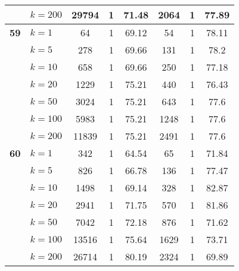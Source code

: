 \begin{table}[htbp]
\begin{tabular}{|l|l|c|c|c|c|c|c|}
     & $k=200$ & 29794 & 1 & 71.48 & 2064 & 1 & 77.89 \\ \hline
    \multicolumn{1}{|r|}{\textbf{59}} & $k=1$ & 64 & 1 & 69.12 & 54 & 1 & 78.11 \\ 
     & $k=5$ & 278 & 1 & 69.66 & 131 & 1 & 78.2 \\ 
     & $k=10$ & 658 & 1 & 69.66 & 250 & 1 & 77.18 \\ 
     & $k=20$ & 1229 & 1 & 75.21 & 440 & 1 & 76.43 \\ 
     & $k=50$ & 3024 & 1 & 75.21 & 643 & 1 & 77.6 \\ 
     & $k=100$ & 5983 & 1 & 75.21 & 1248 & 1 & 77.6 \\ 
     & $k=200$ & 11839 & 1 & 75.21 & 2491 & 1 & 77.6 \\ \hline
    \multicolumn{1}{|r|}{\textbf{60}} & $k=1$ & 342 & 1 & 64.54 & 65 & 1 & 71.84 \\ 
     & $k=5$ & 826 & 1 & 66.78 & 136 & 1 & 77.47 \\ 
     & $k=10$ & 1498 & 1 & 69.14 & 328 & 1 & 82.87 \\ 
     & $k=20$ & 2941 & 1 & 71.75 & 570 & 1 & 81.86 \\ 
     & $k=50$ & 7042 & 1 & 72.18 & 876 & 1 & 71.62 \\ 
     & $k=100$ & 13516 & 1 & 75.64 & 1629 & 1 & 73.71 \\ 
     & $k=200$ & 26714 & 1 & 80.19 & 2324 & 1 & 69.89 \\ \hline
    \end{tabular}
\end{table}
